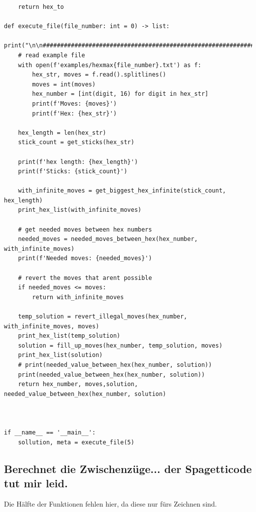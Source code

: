 \documentclass[a4paper,10pt,ngerman]{scrartcl}
\begin{document}
\begin{lstlisting}
    return hex_to

def execute_file(file_number: int = 0) -> list:
    print("\n\n#############################################################################################################################################")
    # read example file
    with open(f'examples/hexmax{file_number}.txt') as f:
        hex_str, moves = f.read().splitlines()
        moves = int(moves)
        hex_number = [int(digit, 16) for digit in hex_str]
        print(f'Moves: {moves}')
        print(f'Hex: {hex_str}')

    hex_length = len(hex_str)
    stick_count = get_sticks(hex_str)

    print(f'hex length: {hex_length}')
    print(f'Sticks: {stick_count}')

    with_infinite_moves = get_biggest_hex_infinite(stick_count, hex_length)
    print_hex_list(with_infinite_moves)

    # get needed moves between hex numbers
    needed_moves = needed_moves_between_hex(hex_number, with_infinite_moves)
    print(f'Needed moves: {needed_moves}')

    # revert the moves that arent possible
    if needed_moves <= moves:
        return with_infinite_moves

    temp_solution = revert_illegal_moves(hex_number, with_infinite_moves, moves)
    print_hex_list(temp_solution)
    solution = fill_up_moves(hex_number, temp_solution, moves)
    print_hex_list(solution)
    # print(needed_value_between_hex(hex_number, solution))
    print(needed_value_between_hex(hex_number, solution))
    return hex_number, moves,solution, needed_value_between_hex(hex_number, solution)



if __name__ == '__main__':
    sollution, meta = execute_file(5)
\end{lstlisting}	

\subsection{Berechnet die Zwischenzüge... der Spagetticode tut mir leid.}

Die Hälfte der Funktionen fehlen hier, da diese nur fürs Zeichnen sind.
\end{document}
